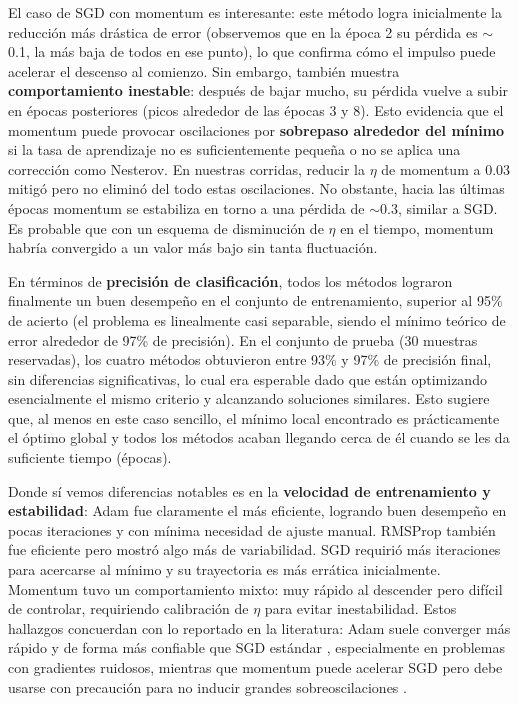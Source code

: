 \documentclass[12pt, spanish]{article}
\begin{document}
El caso de SGD con momentum es interesante: este método logra inicialmente la reducción más drástica de error (observemos que en la época 2 su pérdida es $\sim$0.1, la más baja de todos en ese punto), lo que confirma cómo el impulso puede acelerar el descenso al comienzo. Sin embargo, también muestra \textbf{comportamiento inestable}: después de bajar mucho, su pérdida vuelve a subir en épocas posteriores (picos alrededor de las épocas 3 y 8). Esto evidencia que el momentum puede provocar oscilaciones por \textbf{sobrepaso alrededor del mínimo} si la tasa de aprendizaje no es suficientemente pequeña o no se aplica una corrección como Nesterov. En nuestras corridas, reducir la $\eta$ de momentum a 0.03 mitigó pero no eliminó del todo estas oscilaciones. No obstante, hacia las últimas épocas momentum se estabiliza en torno a una pérdida de $\sim$0.3, similar a SGD. Es probable que con un esquema de disminución de $\eta$ en el tiempo, momentum habría convergido a un valor más bajo sin tanta fluctuación.

En términos de \textbf{precisión de clasificación}, todos los métodos lograron finalmente un buen desempeño en el conjunto de entrenamiento, superior al 95\% de acierto (el problema es linealmente casi separable, siendo el mínimo teórico de error alrededor de 97\% de precisión). En el conjunto de prueba (30 muestras reservadas), los cuatro métodos obtuvieron entre 93\% y 97\% de precisión final, sin diferencias significativas, lo cual era esperable dado que están optimizando esencialmente el mismo criterio y alcanzando soluciones similares. Esto sugiere que, al menos en este caso sencillo, el mínimo local encontrado es prácticamente el óptimo global y todos los métodos acaban llegando cerca de él cuando se les da suficiente tiempo (épocas).

Donde sí vemos diferencias notables es en la \textbf{velocidad de entrenamiento y estabilidad}: Adam fue claramente el más eficiente, logrando buen desempeño en pocas iteraciones y con mínima necesidad de ajuste manual. RMSProp también fue eficiente pero mostró algo más de variabilidad. SGD requirió más iteraciones para acercarse al mínimo y su trayectoria es más errática inicialmente. Momentum tuvo un comportamiento mixto: muy rápido al descender pero difícil de controlar, requiriendo calibración de $\eta$ para evitar inestabilidad. Estos hallazgos concuerdan con lo reportado en la literatura: Adam suele converger más rápido y de forma más confiable que SGD estándar \cite{ref2}, especialmente en problemas con gradientes ruidosos, mientras que momentum puede acelerar SGD pero debe usarse con precaución para no inducir grandes sobreoscilaciones \cite{ref4}.
\end{document}

